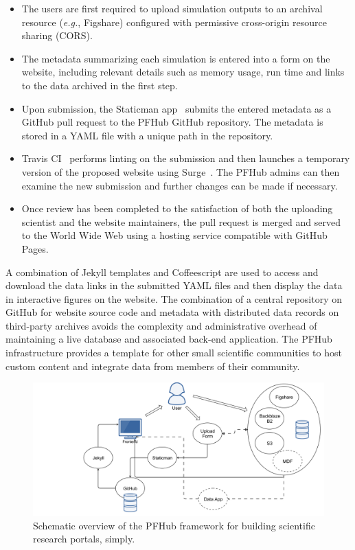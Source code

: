 \documentclass{jors}
\begin{document}
\begin{itemize}
  \item The users are first required to upload simulation outputs to
    an archival resource (\emph{e.g.}, Figshare) configured with
    permissive cross-origin resource sharing (CORS).
  \item The metadata summarizing each simulation is entered into a
    form on the website, including relevant details such as memory
    usage, run time and links to the data archived in the first step.
  \item Upon submission, the Staticman app~\cite{staticman} submits
    the entered metadata as a GitHub pull request to the PFHub GitHub
    repository.  The metadata is stored in a YAML file with a unique
    path in the repository.
  \item Travis CI~\cite{travis} performs linting on the submission and
    then launches a temporary version of the proposed website using
    Surge~\cite{surge}. The PFHub admins can then examine the new
    submission and further changes can be made if necessary.
  \item Once review has been completed to the satisfaction of both the
    uploading scientist and the website maintainers, the pull request
    is merged and served to the World Wide Web using a hosting service
    compatible with GitHub Pages.
\end{itemize}

A combination of Jekyll templates and Coffeescript are used to access
and download the data links in the submitted YAML files and then
display the data in interactive figures on the website. The
combination of a central repository on GitHub for website source code
and metadata with distributed data records on third-party archives
avoids the complexity and administrative overhead of maintaining a
live database and associated back-end application. The PFHub
infrastructure provides a template for other small scientific
communities to host custom content and integrate data from members of
their community.

\begin{figure}
  \includegraphics[width=\textwidth]{pfhub_website.png}
  \caption{Schematic overview of the PFHub framework for building
    scientific research portals, simply.}
  \centering
  \label{fig:pfhub_website}
\end{figure}
\end{document}
